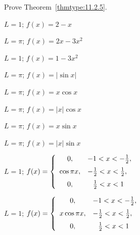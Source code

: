\begin{exerciselist}
  \item\label{exer:11.2.1} Prove Theorem~\ref{thmtype:11.2.5}.


  \item\label{exer:11.2.2} \Cex $L=1$; \quad $f(x)=2-x$

  \item\label{exer:11.2.3} $L=\pi$; \quad$f(x)=2x-3x^{2}$

  \item\label{exer:11.2.4} $L=1$; \quad$f(x)=1-3x^{2}$

  \item\label{exer:11.2.5} $L=\pi$; \quad$f(x)=|\sin x|$

  \item\label{exer:11.2.6} \Cex $L=\pi$; \quad$f(x)=x\cos x$

  \item\label{exer:11.2.7} $L=\pi$; \quad$f(x)=|x|\cos x$

  \item\label{exer:11.2.8} \Cex $L=\pi$; \quad$f(x)=x\sin x$

  \item\label{exer:11.2.9} $L=\pi$; \quad$f(x)=|x|\sin x$

  \item\label{exer:11.2.10} $L=1$; \quad$f(x)= \left\{
  \begin{array}{cl}
    0,         & -1<x<-\frac{1}{2},           \\[2\jot]
    \cos\pi x, & -\frac{1}{2}<x<\frac{1}{2},  \\[2\jot]
    0,         & \phantom{-}{\frac{1}{2}}<x<1
  \end{array}\right.$

  \item\label{exer:11.2.11} $L=1$; \quad$f(x)= \left\{
  \begin{array}{cl}
    0,          & -1<x<-\frac{1}{2},           \\[2\jot]
    x\cos\pi x, & -\frac{1}{2}<x<\frac{1}{2},  \\[2\jot]
    0,          & \phantom{-}{\frac{1}{2}}<x<1
  \end{array}\right.$


\end{exerciselist}
